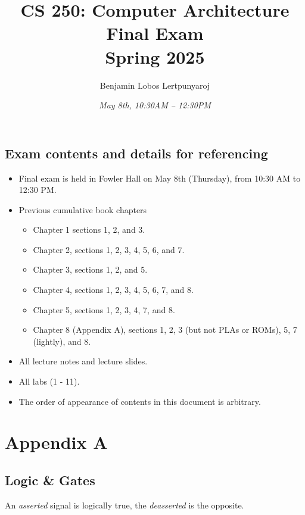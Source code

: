 \documentclass[11pt]{article}
\title{\textbf{CS 250: Computer Architecture\\Final Exam\\Spring 2025}}
\author{Benjamin Lobos Lertpunyaroj}
\date{\textit{May 8th, 10:30{\tiny AM} – 12:30{\tiny PM}}}
\begin{document}
\maketitle

\vspace{-3em}

\begin{center}
\section*{Exam contents and details for referencing}
\end{center}

\begin{itemize}[itemsep=-0.5em, left=0pt, label={•}]
    \item Final exam is held in Fowler Hall on May 8th (Thursday), from 10:30 {\tiny AM} to 12:30 {\tiny PM}.
    \item Previous cumulative book chapters
    \vspace{-0.8em}
    \begin{itemize}[itemsep=-0.5em, left=0pt, label={•}]
    \item Chapter 1 sections 1, 2, and 3.
    \item Chapter 2, sections 1, 2, 3, 4, 5, 6, and 7.
    \item Chapter 3, sections 1, 2, and 5.
    \item Chapter 4, sections 1, 2, 3, 4, 5, 6, 7, and 8.
    \item Chapter 5, sections 1, 2, 3, 4, 7, and 8.
    \item Chapter 8 (Appendix A), sections 1, 2, 3 (but not PLAs or ROMs), 5, 7 (lightly), and 8.
    \end{itemize}
    \item All lecture notes and lecture slides.
    \item All labs (1 - 11).
    \item The order of appearance of contents in this document is arbitrary.
\end{itemize}

\vspace{-1em}
\tableofcontents

\pagebreak

\section*{Appendix A}

\subsection*{Logic \& Gates}
An \textit{asserted} signal is logically true, the \textit{deasserted} is the opposite.
\end{document}
